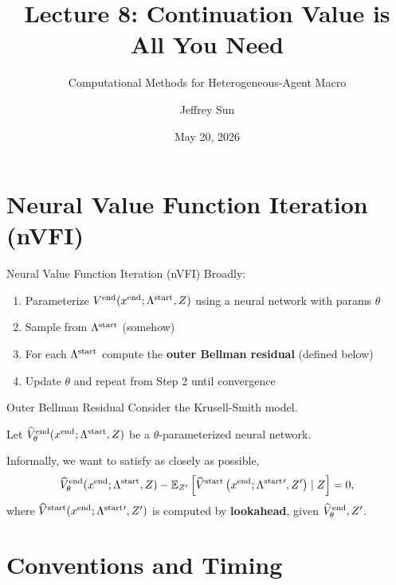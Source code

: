 \documentclass[10pt,aspectratio=169]{beamer}
\title{Lecture 8: Continuation Value is All You Need}
\subtitle{Computational Methods for Heterogeneous-Agent Macro}
\author{Jeffrey Sun}
\institute{University of Toronto}
\date{May 20, 2026}
\begin{document}
\maketitle

\section[nVFI]{Neural Value Function Iteration (nVFI)}

\begin{frame}{Neural Value Function Iteration (nVFI)}
  Broadly:
  \begin{enumerate}
    \item Parameterize $V^{\mathrm{end}}(x^{\mathrm{end}}; \Lambda^{\mathrm{start}}, Z)$ using a neural network with params $\theta$
    \item Sample from $\Lambda^{\mathrm{start}}$ (somehow)
    \item For each $\Lambda^{\mathrm{start}}$ compute the \textbf{outer Bellman residual} (defined below)
    \item Update $\theta$ and repeat from Step 2 until convergence
  \end{enumerate}
\end{frame}

\begin{frame}{Outer Bellman Residual}
  Consider the Krusell-Smith model.

  Let $\widehat{V}^{\mathrm{end}}_\theta(x^{\mathrm{end}}; \Lambda^{\mathrm{start}}, Z)$ be a $\theta$-parameterized neural network.

  Informally, we want to satisfy as closely as possible,
  \[
    \widehat{V}^{\mathrm{end}}_\theta(x^{\mathrm{end}}; \Lambda^{\mathrm{start}}, Z) - \mathbb{E}_{Z'}\left[ \widehat{V}^{\mathrm{start}}\left( x^{\mathrm{end}}; \Lambda^{\mathrm{start}}{}', Z' \right)\mid Z \right] = 0,
  \]
  where $\widehat{V}^{\mathrm{start}}(x^{\mathrm{end}};\Lambda^{\mathrm{start}}{}',Z')$ is computed by \textbf{lookahead}, given $\widehat{V}^{\mathrm{end}}_\theta, Z'$.
\end{frame}

\section[Conventions]{Conventions and Timing}
\end{document}
